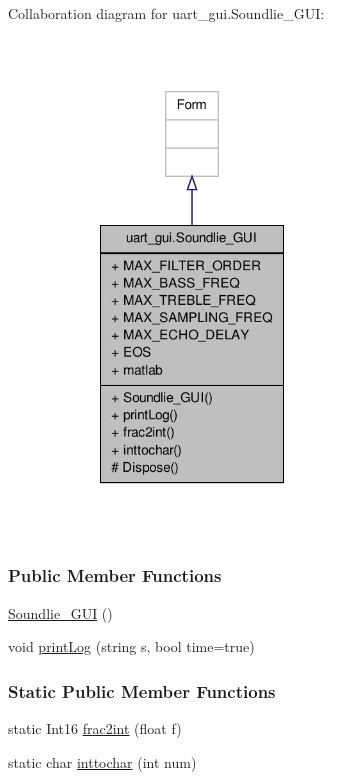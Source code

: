 Collaboration diagram for uart\-\_\-gui.\-Soundlie\-\_\-\-G\-U\-I\-:\nopagebreak
\begin{figure}[H]
\begin{center}
\leavevmode
\includegraphics[width=216pt]{d2/dd1/classuart__gui_1_1_soundlie___g_u_i__coll__graph}
\end{center}
\end{figure}
\subsubsection*{Public Member Functions}
\begin{DoxyCompactItemize}
\item 
\hyperlink{classuart__gui_1_1_soundlie___g_u_i_a6fa0299c3a671064f9409fd7cf591a19}{Soundlie\-\_\-\-G\-U\-I} ()
\item 
void \hyperlink{classuart__gui_1_1_soundlie___g_u_i_abc7db78994d56752133d9cc62938da81}{print\-Log} (string s, bool time=true)
\end{DoxyCompactItemize}
\subsubsection*{Static Public Member Functions}
\begin{DoxyCompactItemize}
\item 
static Int16 \hyperlink{classuart__gui_1_1_soundlie___g_u_i_aa200a65d9bc20ba4625be9c02fb7c4b3}{frac2int} (float f)
\item 
static char \hyperlink{classuart__gui_1_1_soundlie___g_u_i_a1ade5c03bb1f55b814fdc396e4982f72}{inttochar} (int num)
\end{DoxyCompactItemize}
